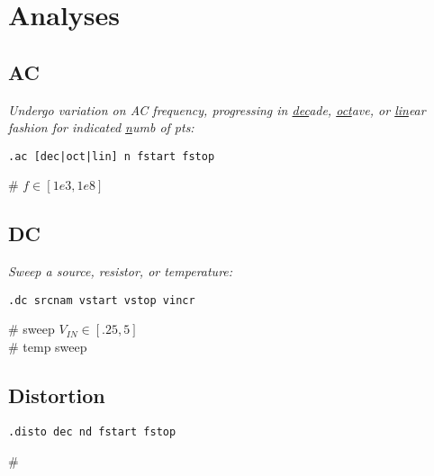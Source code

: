 \section{Analyses}

\subsection*{AC}
\textit{Undergo variation on AC frequency, progressing in \underline{dec}ade, \underline{oct}ave, or \underline{lin}ear fashion for indicated \underline{n}umb of pts:}\\
\begin{lstlisting}
.ac [dec|oct|lin] n fstart fstop
\end{lstlisting}
 \# {\scriptsize $f \in [1e3,1e8]$ }\\[1mm]

\subsection*{DC}
\textit{Sweep a source, resistor, or temperature:}\\
\begin{lstlisting}
.dc srcnam vstart vstop vincr
\end{lstlisting}
 \# {\scriptsize sweep $V_{IN} \in [.25,5]$}\\
 \# {\scriptsize temp sweep} \\

\subsection*{Distortion}
\begin{lstlisting}
.disto dec nd fstart fstop
\end{lstlisting}
 \# {\scriptsize }\\

